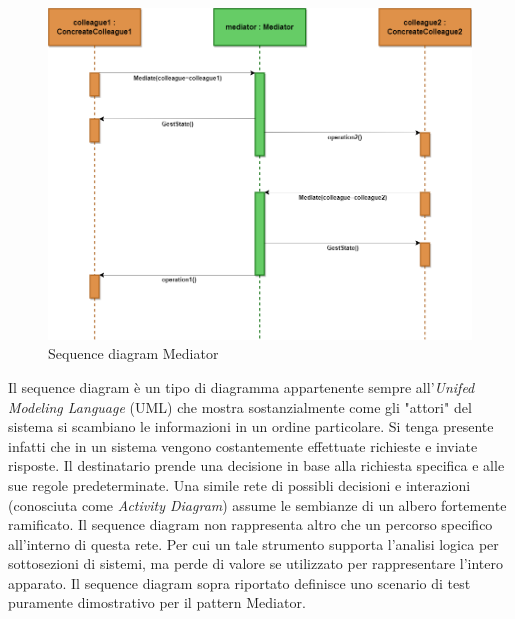\documentclass{article}
\begin{document}
\begin{sloppy}
\bigbreak


\begin{figure}[H]
    \centering
    \includegraphics[scale=0.37]{figure6.png}
    \caption{Sequence diagram Mediator}
    \label{fig:enter-label}
\end{figure}

\bigbreak

Il sequence diagram è un tipo di diagramma appartenente sempre all'\textit{Unifed Modeling Language} (UML) che mostra sostanzialmente come gli "attori" del sistema si scambiano le informazioni in un ordine particolare. Si tenga presente infatti che in un sistema vengono costantemente effettuate richieste e inviate risposte. Il destinatario prende una decisione in base alla richiesta specifica e alle sue regole predeterminate. Una simile rete di possibli decisioni e interazioni (conosciuta come \textit{Activity Diagram}) assume le sembianze di un albero fortemente ramificato. Il sequence diagram non rappresenta altro che un percorso specifico all'interno di questa rete. 
Per cui un tale strumento supporta l'analisi logica per sottosezioni di sistemi, ma perde di valore se utilizzato per rappresentare l'intero apparato.
Il sequence diagram sopra riportato definisce uno scenario di test puramente dimostrativo per il pattern Mediator.


\end{sloppy}
\end{document}
